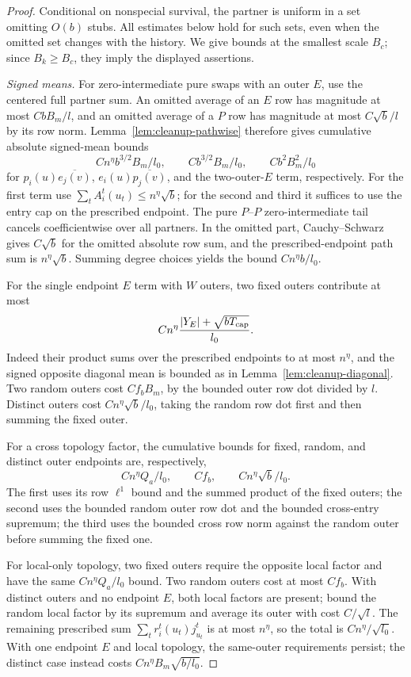 \begin{proof}
Conditional on nonspecial survival, the partner is uniform in
a set omitting $O(b)$ stubs.  All estimates below hold for
such sets, even when the omitted set changes with the history.
We give bounds at the smallest scale $B_c$; since $B_k\geq B_c$,
they imply the displayed assertions.

\emph{Signed means.}
For zero-intermediate pure swaps with an outer $E$, use the
centered full partner sum.  An omitted average of an $E$ row
has magnitude at most $CbB_m/l$, and an omitted average of a
$P$ row has magnitude at most $C\sqrt b/l$ by its row norm.
Lemma~\ref{lem:cleanup-pathwise} therefore gives cumulative
absolute signed-mean bounds
\[
 Cn^\eta b^{3/2}B_m/l_0,\qquad
 Cb^{3/2}B_m/l_0,\qquad
 Cb^2B_m^2/l_0
\]
for $p_i(u)\overline{e_j(v)}$,
$e_i(u)\overline{p_j(v)}$, and the two-outer-$E$ term,
respectively.  For the first term use
$\sum_t A_i^t(u_t)\leq n^\eta\sqrt b$; for the second and
third it suffices to use the entry cap on the prescribed
endpoint.  The pure $P$--$P$ zero-intermediate tail cancels
coefficientwise over all partners.  In the omitted part,
Cauchy--Schwarz gives $C\sqrt b$ for the omitted absolute
row sum, and the prescribed-endpoint path sum is
$n^\eta\sqrt b$.  Summing degree choices yields the bound
$Cn^\eta b/l_0$.

For the single endpoint $E$ term with $W$ outers, two fixed
outers contribute at most
\[
 Cn^\eta\frac{|Y_E|+\sqrt{bT_{\rm cap}}}{l_0}.
\]
Indeed their product sums over the prescribed endpoints to
at most $n^\eta$, and the signed opposite diagonal mean is
bounded as in Lemma~\ref{lem:cleanup-diagonal}.  Two random
outers cost $Cf_bB_m$, by the bounded outer row dot divided
by $l$.  Distinct outers cost $Cn^\eta\sqrt b/l_0$, taking
the random row dot first and then summing the fixed outer.

For a cross topology factor, the cumulative bounds for fixed,
random, and distinct outer endpoints are, respectively,
\[
 Cn^\eta Q_a/l_0,\qquad Cf_b,\qquad
 Cn^\eta\sqrt b/l_0.
\]
The first uses its row $\ell^1$ bound and the summed product
of the fixed outers; the second uses the bounded random
outer row dot and the bounded cross-entry supremum; the
third uses the bounded cross row norm against the random
outer before summing the fixed one.

For local-only topology, two fixed outers require the
opposite local factor and have the same $Cn^\eta Q_a/l_0$
bound.  Two random outers cost at most $Cf_b$.  With distinct
outers and no endpoint $E$, both local factors are present;
bound the random local factor by its supremum and average
its outer with cost $C/\sqrt l$.  The remaining prescribed
sum $\sum_t r_i^t(u_t)j_{u_t}^t$ is at most $n^\eta$,
so the total is $Cn^\eta/\sqrt{l_0}$.  With one endpoint
$E$ and local topology, the same-outer requirements persist;
the distinct case instead costs
$Cn^\eta B_m\sqrt{b/l_0}$.


\end{proof}
